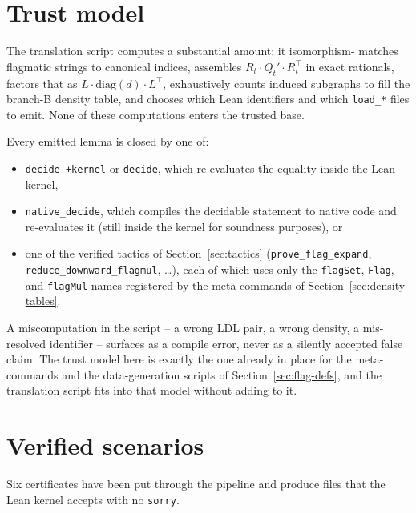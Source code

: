 \documentclass[11pt]{article}
\begin{document}
\section{Trust model}
\label{sec:trust}

The translation script computes a substantial amount: it isomorphism-
matches flagmatic strings to canonical indices, assembles $R_t \cdot
Q_t' \cdot R_t^\top$ in exact rationals, factors that as $L \cdot
\mathrm{diag}(d) \cdot L^\top$, exhaustively counts induced subgraphs to
fill the branch-B density table, and chooses which Lean
identifiers and which \texttt{load\_*} files to emit. None of these
computations enters the trusted base.

Every emitted lemma is closed by one of:
\begin{itemize}
  \item \texttt{decide +kernel} or \texttt{decide}, which re-evaluates
    the equality inside the Lean kernel,
  \item \texttt{native\_decide}, which compiles the decidable statement
    to native code and re-evaluates it (still inside the kernel for
    soundness purposes), or
  \item one of the verified tactics of Section~\ref{sec:tactics}
    (\texttt{prove\_flag\_expand}, \texttt{reduce\_downward\_flagmul},
    \ldots), each of which uses only the \texttt{flagSet}, \texttt{Flag},
    and \texttt{flagMul} names registered by the meta-commands of
    Section~\ref{sec:density-tables}.
\end{itemize}
A miscomputation in the script -- a wrong LDL pair, a wrong density, a
mis-resolved identifier -- surfaces as a compile error, never as a
silently accepted false claim. The trust model here is exactly the one
already in place for the meta-commands and the data-generation
scripts of Section~\ref{sec:flag-defs}, and the translation script
fits into that model without adding to it.

\section{Verified scenarios}
\label{sec:scenarios}

Six certificates have been put through the pipeline and produce files
that the Lean kernel accepts with no \texttt{sorry}.
\end{document}
